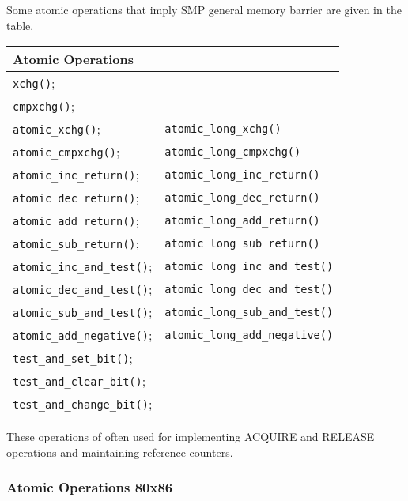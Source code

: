 \documentclass{article}
\begin{document}
Some atomic operations that imply SMP general memory barrier are given
in the table.

\begin{center}
  \begin{tabular}{| l | l |}    
    \hline
    Atomic Operations &  \\ \hline
    \lstinline{xchg()}; & \\
    \lstinline{cmpxchg()}; & \\
    \lstinline{atomic_xchg()}; &			\lstinline{atomic_long_xchg()} \\
    \lstinline{atomic_cmpxchg()}; &		        \lstinline{atomic_long_cmpxchg()} \\
    \lstinline{atomic_inc_return()}; &		        \lstinline{atomic_long_inc_return()} \\
    \lstinline{atomic_dec_return()}; &		        \lstinline{atomic_long_dec_return()} \\
    \lstinline{atomic_add_return()}; &		        \lstinline{atomic_long_add_return()} \\
    \lstinline{atomic_sub_return()}; &		        \lstinline{atomic_long_sub_return()} \\
    \lstinline{atomic_inc_and_test()}; &		\lstinline{atomic_long_inc_and_test()} \\
    \lstinline{atomic_dec_and_test()}; &		\lstinline{atomic_long_dec_and_test()} \\
    \lstinline{atomic_sub_and_test()}; &		\lstinline{atomic_long_sub_and_test()} \\
    \lstinline{atomic_add_negative()}; &		\lstinline{atomic_long_add_negative()} \\
    \lstinline{test_and_set_bit()}; & \\
    \lstinline{test_and_clear_bit()}; & \\
    \lstinline{test_and_change_bit()}; &     \\
    \hline
  \end{tabular}
\end{center}

These operations of often used for implementing ACQUIRE and RELEASE
operations and maintaining reference counters.


\subsubsection{Atomic Operations 80x86}
\end{document}
